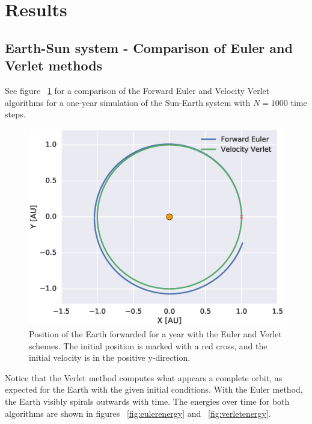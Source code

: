 \documentclass[aps,reprint]{revtex4-1}
\begin{document}
\section{Results}
\label{sec:results}
\subsection{Earth-Sun system - Comparison of Euler and Verlet methods}
\label{sec:earthsunresults}
See figure ~\ref{fig:earthsunorbits} for a comparison of the Forward Euler and
Velocity Verlet algorithms for a one-year simulation of the Sun-Earth system with
$N = 1000$ time steps.
\begin{figure}[H]
  \centering
  \includegraphics[width=\columnwidth]{figures/eulerverlet.eps}
  \caption{Position of the Earth forwarded for a year with the Euler and Verlet
  schemes. The initial position is marked with a red cross, and the initial
  velocity is in the positive y-direction.}
  \label{fig:earthsunorbits}
\end{figure}
Notice that the Verlet method computes what appears a complete orbit, as expected
for the Earth with the given initial conditions. With the Euler method, the Earth
visibly spirals outwards with time. The energies over time for both algorithms
are shown in figures ~\ref{fig:eulerenergy} and ~\ref{fig:verletenergy}.
\end{document}
